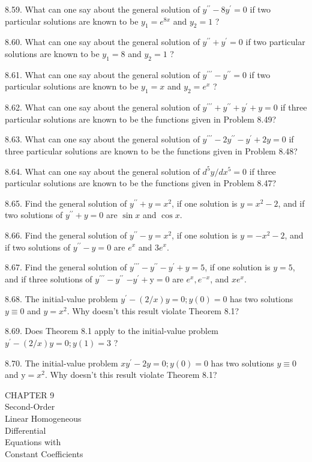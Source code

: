 \documentclass[10pt]{article}
\begin{document}
8.59. What can one say about the general solution of $y^{\prime \prime}-8 y^{\prime}=0$ if two particular solutions are known to be $y_{1}=e^{8 x}$ and $y_{2}=1$ ?

8.60. What can one say about the general solution of $y^{\prime \prime}+y^{\prime}=0$ if two particular solutions are known to be $y_{1}=8$ and $y_{2}=1$ ?

8.61. What can one say about the general solution of $y^{\prime \prime \prime}-y^{\prime \prime}=0$ if two particular solutions are known to be $y_{1}=x$ and $y_{2}=e^{x}$ ?

8.62. What can one say about the general solution of $y^{\prime \prime \prime}+y^{\prime \prime}+y^{\prime}+y=0$ if three particular solutions are known to be the functions given in Problem 8.49?

8.63. What can one say about the general solution of $y^{\prime \prime \prime}-2 y^{\prime \prime}-y^{\prime}+2 y=0$ if three particular solutions are known to be the functions given in Problem 8.48?

8.64. What can one say about the general solution of $d^{5} y / d x^{5}=0$ if three particular solutions are known to be the functions given in Problem 8.47?

8.65. Find the general solution of $y^{\prime \prime}+y=x^{2}$, if one solution is $y=x^{2}-2$, and if two solutions of $y^{\prime \prime}+y=0$ are $\sin x$ and $\cos x$.

8.66. Find the general solution of $y^{\prime \prime}-y=x^{2}$, if one solution is $y=-x^{2}-2$, and if two solutions of $y^{\prime \prime}-y=0$ are $e^{x}$ and $3 e^{x}$.

8.67. Find the general solution of $y^{\prime \prime \prime}-y^{\prime \prime}-y^{\prime}+y=5$, if one solution is $y=5$, and if three solutions of $y^{\prime \prime \prime}-y^{\prime \prime}$ $-y^{\prime}+\mathrm{y}=0$ are $e^{x}, e^{-x}$, and $x e^{x}$.

8.68. The initial-value problem $y^{\prime}-(2 / x) y=0 ; y(0)=0$ has two solutions $y \equiv 0$ and $y=x^{2}$. Why doesn't this result violate Theorem 8.1?

8.69. Does Theorem 8.1 apply to the initial-value problem $y^{\prime}-(2 / x) y=0 ; y(1)=3$ ?

8.70. The initial-value problem $x y^{\prime}-2 y=0 ; y(0)=0$ has two solutions $y \equiv 0$ and $\mathrm{y}=x^{2}$. Why doesn't this result violate Theorem 8.1?

CHAPTER 9\\
Second-Order\\
Linear Homogeneous\\
Differential\\
Equations with\\
Constant Coefficients
\end{document}
